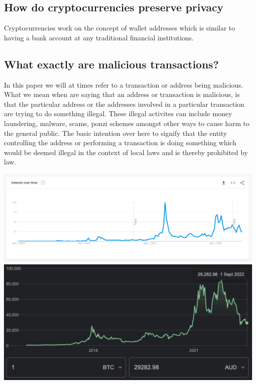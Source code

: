 \documentclass{article}
\begin{document}
\subsection{How do cryptocurrencies preserve privacy}

Cryptocurrencies work on the concept of wallet addresses which is similar to having a bank account at any traditional financial institutions. 

\subsection{What exactly are malicious transactions?}
In this paper we will at times refer to a transaction or address being malicious. What we mean when are saying that an address or transaction is malicious, is that the particular address or the addresses involved in a particular transaction are trying to do something illegal. These illegal activites can include money laundering, malware, scams, ponzi schemes amongst other ways to cause harm to the general public. The basic intention over here to signify that the entity controlling the address or performing a transaction is doing something which would be deemed illegal in the context of local laws and is thereby prohibited by law. 

\pagebreak

\includegraphics[width=1\linewidth]{BTC_Popularity.png}
\includegraphics[width=1.1\linewidth]{BTC_Price.png}
\end{document}
